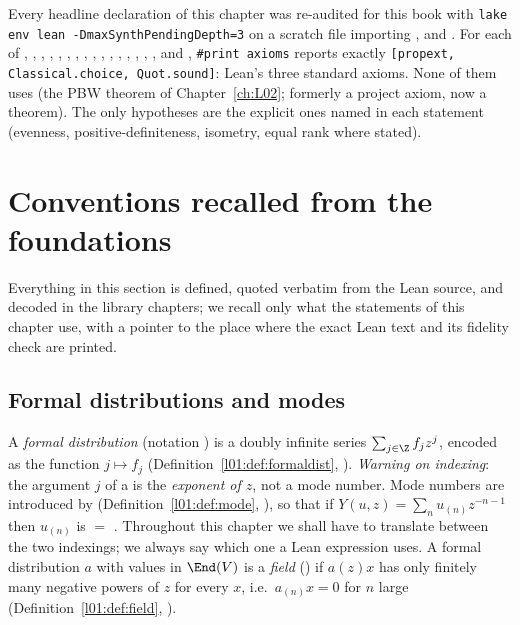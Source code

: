 \begin{status}
Every headline declaration of this chapter was re-audited for this book with
\texttt{lake env lean -DmaxSynthPendingDepth=3} on a scratch file importing
,  and
. For each of ,
, , ,
, , , ,
, , ,
, , ,
, ,  and
, \texttt{\#print axioms} reports exactly
\texttt{[propext, Classical.choice, Quot.sound]}: Lean's three standard axioms. None of them uses
 (the PBW theorem of Chapter~\ref{ch:L02}; formerly a project axiom, now a theorem). The only hypotheses are the explicit ones named in each
statement (evenness, positive-definiteness, isometry, equal rank where stated).
\end{status}

\section{Conventions recalled from the foundations}\label{ch03:sec:conventions}

Everything in this section is defined, quoted verbatim from the Lean source, and decoded in the
library chapters; we recall only what the statements of this chapter use, with a pointer to the
place where the exact Lean text and its fidelity check are printed.

\subsection{Formal distributions and modes}

A \emph{formal distribution}  (notation ) is a doubly infinite
series $\sum_{j\in\Z}f_jz^j$, encoded as the function $j\mapsto f_j$
(Definition~\ref{l01:def:formaldist}, ).
\emph{Warning on indexing}: the argument $j$ of a  is the \emph{exponent of $z$},
not a mode number. Mode numbers are introduced by 
(Definition~\ref{l01:def:mode}, ), so that if
$Y(u,z)=\sum_n u_{(n)}z^{-n-1}$ then $u_{(n)}$ is  $=$ .
Throughout this chapter we shall have to translate between the two indexings; we always say which
one a Lean expression uses. A formal distribution $a$ with values in $\End(V)$ is a \emph{field}
() if $a(z)x$ has only finitely many negative powers of $z$ for every $x$, i.e.\
$a_{(n)}x=0$ for $n$ large (Definition~\ref{l01:def:field}, ).

